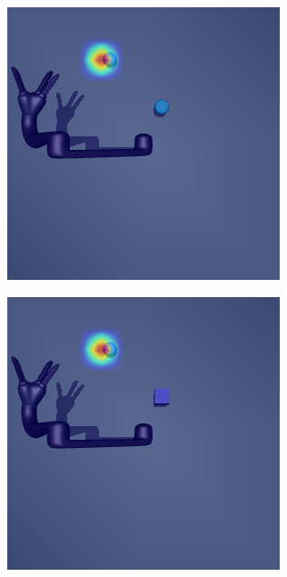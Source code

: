 \begin{figure}[h!]
  \begin{subfigure}{0.24\columnwidth}
    \includegraphics[width=\linewidth]{figures/chapter6/distractor_saliency_jaco_pro_on/color_sensor_random}
  \end{subfigure}
  \begin{subfigure}{0.24\columnwidth}
    \includegraphics[width=\linewidth]{figures/chapter6/distractor_saliency_jaco_pro_on/shape_sensor_random}

\end{subfigure}
\end{figure}
